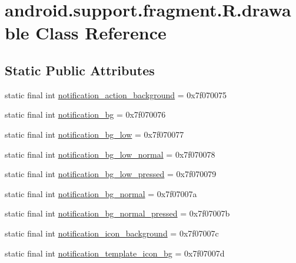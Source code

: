 \hypertarget{classandroid_1_1support_1_1fragment_1_1_r_1_1drawable}{}\section{android.\+support.\+fragment.\+R.\+drawable Class Reference}
\label{classandroid_1_1support_1_1fragment_1_1_r_1_1drawable}
\subsection*{Static Public Attributes}
\begin{DoxyCompactItemize}
\item 
static final int \mbox{\hyperlink{classandroid_1_1support_1_1fragment_1_1_r_1_1drawable_a086af7e7931dbe4e82c720a77fe3d3ae}{notification\+\_\+action\+\_\+background}} = 0x7f070075
\item 
static final int \mbox{\hyperlink{classandroid_1_1support_1_1fragment_1_1_r_1_1drawable_a6f047fed5aab004876674c2a21947011}{notification\+\_\+bg}} = 0x7f070076
\item 
static final int \mbox{\hyperlink{classandroid_1_1support_1_1fragment_1_1_r_1_1drawable_ae752bec4177894876af7fe198eef3a93}{notification\+\_\+bg\+\_\+low}} = 0x7f070077
\item 
static final int \mbox{\hyperlink{classandroid_1_1support_1_1fragment_1_1_r_1_1drawable_affebf5f3af26bcc00661a293dc1aab89}{notification\+\_\+bg\+\_\+low\+\_\+normal}} = 0x7f070078
\item 
static final int \mbox{\hyperlink{classandroid_1_1support_1_1fragment_1_1_r_1_1drawable_ae105cc655521bfd8d0a45fc06338ed5d}{notification\+\_\+bg\+\_\+low\+\_\+pressed}} = 0x7f070079
\item 
static final int \mbox{\hyperlink{classandroid_1_1support_1_1fragment_1_1_r_1_1drawable_a58ea29ffeb1ee70047e694a612e479d0}{notification\+\_\+bg\+\_\+normal}} = 0x7f07007a
\item 
static final int \mbox{\hyperlink{classandroid_1_1support_1_1fragment_1_1_r_1_1drawable_a68c5f11206805023128791be315ec21e}{notification\+\_\+bg\+\_\+normal\+\_\+pressed}} = 0x7f07007b
\item 
static final int \mbox{\hyperlink{classandroid_1_1support_1_1fragment_1_1_r_1_1drawable_a865ae832f4735278aca10303e960e96c}{notification\+\_\+icon\+\_\+background}} = 0x7f07007c
\item 
static final int \mbox{\hyperlink{classandroid_1_1support_1_1fragment_1_1_r_1_1drawable_a1edff3cf073bb370d690cfb30db587fc}{notification\+\_\+template\+\_\+icon\+\_\+bg}} = 0x7f07007d

\end{DoxyCompactItemize}
